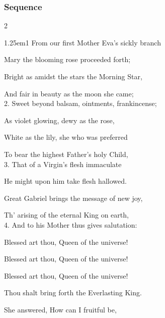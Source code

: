 \clearpage
\subsubsection{Sequence}

\vspace{-0.5\baselineskip}

\begin{multicols}{2}
\begin{hangparas}{1.25em}{1}
From our first Mother Eva's sickly branch

Mary the blooming rose proceeded forth;

Bright as amidst the stars the Morning Star,

And fair in beauty as the moon she came;\\


2. Sweet beyond balsam, ointments, frankincense;

As violet glowing, dewy as the rose,

White as the lily, she who was preferred

To bear the highest Father's holy Child,\\


3. That of a Virgin's flesh immaculate

He might upon him take flesh hallowed.

Great Gabriel brings the message of new joy,

Th' arising of the eternal King on earth,\\


4. And to his Mother thus gives salutation:

Blessed art thou, Queen of the universe!

Blessed art thou, Queen of the universe!

Blessed art thou, Queen of the universe!

Thou shalt bring forth the Everlasting King.

She answered, How can I fruitful be,\\



\end{hangparas}
\end{multicols}
